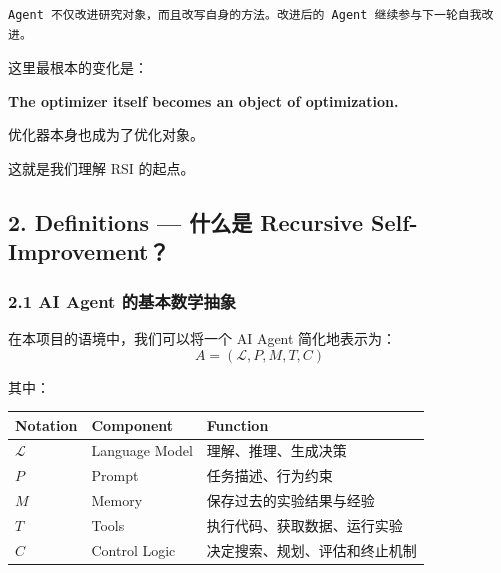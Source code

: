 \begin{verbatim}
Agent 不仅改进研究对象，而且改写自身的方法。改进后的 Agent 继续参与下一轮自我改进。
\end{verbatim}

这里最根本的变化是：

\textbf{The optimizer itself becomes an object of optimization.}

优化器本身也成为了优化对象。

这就是我们理解 RSI 的起点。

\hypertarget{part-1-07-0001-definitions-ux4ec0ux4e48ux662f-recursive-self-improvement}{%
\subsection{2. Definitions --- 什么是 Recursive Self-Improvement？}\label{part-1-07-0001-definitions-ux4ec0ux4e48ux662f-recursive-self-improvement}}

\hypertarget{part-1-07-0001-ai-agent-ux7684ux57faux672cux6570ux5b66ux62bdux8c61}{%
\subsubsection{2.1 AI Agent 的基本数学抽象}\label{part-1-07-0001-ai-agent-ux7684ux57faux672cux6570ux5b66ux62bdux8c61}}

在本项目的语境中，我们可以将一个 AI Agent 简化地表示为：
\[A=(\mathcal L,P,M,T,C)\]

其中：

\begin{readertable}
\begin{longtable}[]{@{}
  >{\raggedright\arraybackslash}p{}
  >{\raggedright\arraybackslash}p{}
  >{\raggedright\arraybackslash}p{}@{}}
\toprule
Notation & Component & Function \\
\midrule
\endhead
\(\mathcal L\) & Language Model & 理解、推理、生成决策 \\
\(P\) & Prompt & 任务描述、行为约束 \\
\(M\) & Memory & 保存过去的实验结果与经验 \\
\(T\) & Tools & 执行代码、获取数据、运行实验 \\
\(C\) & Control Logic & 决定搜索、规划、评估和终止机制 \\
\bottomrule
\end{longtable}
\end{readertable}

